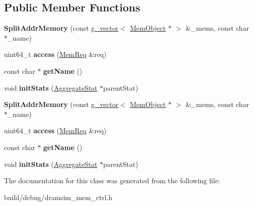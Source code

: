 \subsection*{Public Member Functions}
\begin{DoxyCompactItemize}
\item 
\hypertarget{classSplitAddrMemory_ac2da51ecfa1c6fe8e3199dcd944b2e83}{{\bfseries Split\-Addr\-Memory} (const \hyperlink{classg__vector}{g\-\_\-vector}$<$ \hyperlink{classMemObject}{Mem\-Object} $\ast$ $>$ \&\-\_\-mems, const char $\ast$\-\_\-name)}\label{classSplitAddrMemory_ac2da51ecfa1c6fe8e3199dcd944b2e83}

\item 
\hypertarget{classSplitAddrMemory_aaaae1b167da3dfe97dbf32dbb832d3eb}{uint64\-\_\-t {\bfseries access} (\hyperlink{structMemReq}{Mem\-Req} \&req)}\label{classSplitAddrMemory_aaaae1b167da3dfe97dbf32dbb832d3eb}

\item 
\hypertarget{classSplitAddrMemory_ae2d82498e1e28fcd5c7e3f292242bd82}{const char $\ast$ {\bfseries get\-Name} ()}\label{classSplitAddrMemory_ae2d82498e1e28fcd5c7e3f292242bd82}

\item 
\hypertarget{classSplitAddrMemory_a5f1a6703cae8a559bf8e084dde47aa48}{void {\bfseries init\-Stats} (\hyperlink{classAggregateStat}{Aggregate\-Stat} $\ast$parent\-Stat)}\label{classSplitAddrMemory_a5f1a6703cae8a559bf8e084dde47aa48}

\item 
\hypertarget{classSplitAddrMemory_ac2da51ecfa1c6fe8e3199dcd944b2e83}{{\bfseries Split\-Addr\-Memory} (const \hyperlink{classg__vector}{g\-\_\-vector}$<$ \hyperlink{classMemObject}{Mem\-Object} $\ast$ $>$ \&\-\_\-mems, const char $\ast$\-\_\-name)}\label{classSplitAddrMemory_ac2da51ecfa1c6fe8e3199dcd944b2e83}

\item 
\hypertarget{classSplitAddrMemory_aaaae1b167da3dfe97dbf32dbb832d3eb}{uint64\-\_\-t {\bfseries access} (\hyperlink{structMemReq}{Mem\-Req} \&req)}\label{classSplitAddrMemory_aaaae1b167da3dfe97dbf32dbb832d3eb}

\item 
\hypertarget{classSplitAddrMemory_ae2d82498e1e28fcd5c7e3f292242bd82}{const char $\ast$ {\bfseries get\-Name} ()}\label{classSplitAddrMemory_ae2d82498e1e28fcd5c7e3f292242bd82}

\item 
\hypertarget{classSplitAddrMemory_a5f1a6703cae8a559bf8e084dde47aa48}{void {\bfseries init\-Stats} (\hyperlink{classAggregateStat}{Aggregate\-Stat} $\ast$parent\-Stat)}\label{classSplitAddrMemory_a5f1a6703cae8a559bf8e084dde47aa48}

\end{DoxyCompactItemize}


The documentation for this class was generated from the following file\-:\begin{DoxyCompactItemize}
\item 
build/debug/dramsim\-\_\-mem\-\_\-ctrl.\-h\end{DoxyCompactItemize}

